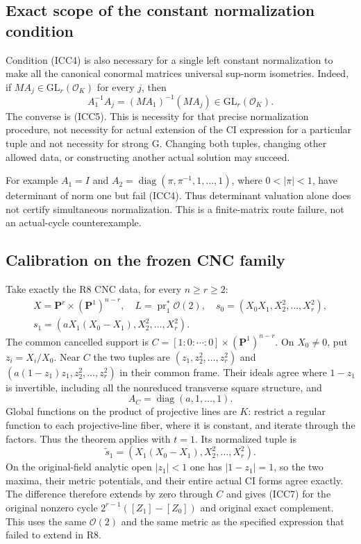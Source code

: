 \subsection{Exact scope of the constant normalization condition}

Condition (ICC4) is also necessary for a single left constant
normalization to make all the canonical conormal matrices
universal sup-norm isometries.  Indeed, if
$MA_j\in\mathrm{GL}_r(\mathcal O_K)$ for every $j$, then
\[
          A_1^{-1}A_j=(MA_1)^{-1}(MA_j)
                              \in\mathrm{GL}_r(\mathcal O_K).
 \tag{ICC11}
\]
The converse is (ICC5).  This is necessity for that precise
normalization procedure, not necessity for actual extension
of the CI expression for a particular tuple and not necessity
for strong G.  Changing both tuples, changing other allowed
data, or constructing another actual solution may succeed.

For example $A_1=I$ and
$A_2=\operatorname{diag}(\pi,\pi^{-1},1,\ldots,1)$, where
$0<|\pi|<1$, have determinant of norm one but fail (ICC4).
Thus determinant valuation alone does not certify simultaneous
normalization.  This is a finite-matrix route failure, not
an actual-cycle counterexample.

\subsection{Calibration on the frozen CNC family}

Take exactly the R8 CNC data, for every $n\ge r\ge2$:
\[
 \begin{gathered}
 X=\mathbf P^r\times(\mathbf P^1)^{n-r},\quad
 L=\operatorname{pr}_1^*\mathcal O(2),\quad
 s_0=(X_0X_1,X_2^2,\ldots,X_r^2),\\
 s_1=(aX_1(X_0-X_1),X_2^2,\ldots,X_r^2).
 \end{gathered}
 \tag{ICC12}
\]
The common cancelled support is
$C=[1:0:\cdots:0]\times(\mathbf P^1)^{n-r}$.
On $X_0\ne0$, put $z_i=X_i/X_0$.  Near $C$ the two tuples
are $(z_1,z_2^2,\ldots,z_r^2)$ and
$(a(1-z_1)z_1,z_2^2,\ldots,z_r^2)$ in their common frame.
Their ideals agree where $1-z_1$ is invertible, including
all the nonreduced transverse square structure, and
\[
                      A_C=\operatorname{diag}(a,1,\ldots,1).
 \tag{ICC13}
\]
Global functions on the product of projective lines are $K$:
restrict a regular function to each projective-line fiber,
where it is constant, and iterate through the factors.
Thus the theorem applies with $t=1$.  Its normalized tuple is
\[
                  \widetilde s_1=(X_1(X_0-X_1),X_2^2,\ldots,X_r^2).
 \tag{ICC14}
\]
On the original-field analytic open $|z_1|<1$ one has
$|1-z_1|=1$, so the two maxima, their metric potentials, and
their entire actual CI forms agree exactly.  The difference
therefore extends by zero through $C$ and gives (ICC7) for
the original nonzero cycle
$2^{r-1}([Z_1]-[Z_0])$ and original exact complement.
This uses the same $\mathcal O(2)$ and the same metric as the
specified expression that failed to extend in R8.

